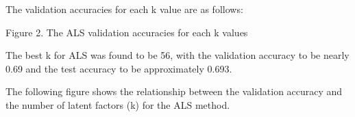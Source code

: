 \documentclass[letterpaper]{article}
\begin{document}
\bigskip

The validation accuracies for each k value are as follows: 




{\centering
Figure 2. The ALS validation accuracies for each k values
\par}


\bigskip

The best k for ALS was found to be 56, with the validation accuracy to be nearly 0.69 and the test accuracy to be
approximately 0.693.


\bigskip

The following figure shows the relationship between the validation accuracy and the number of latent factors (k) for the
ALS method.


\end{document}
